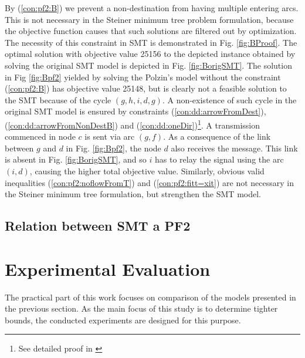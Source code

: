      By (\ref{con:pf2:B}) we prevent a non-destination from having multiple entering arcs. This is not necessary in the Steiner minimum tree problem formulation, because the objective function causes that such solutions are filtered out by optimization. The necessity of this constraint in SMT is demonstrated in Fig. \ref{fig:BProof}. The optimal solution with objective value 25156 to the depicted instance obtained by solving the original SMT model is depicted in Fig. \ref{fig:BorigSMT}. The solution in Fig \ref{fig:Bpf2} yielded by solving the Polzin's model without the constraint (\ref{con:pf2:B}) has objective value 25148, but is clearly not a feasible solution to the SMT because of the cycle $(g,h,i,d,g)$. A non-existence of such cycle in the original SMT model is ensured by constraints (\ref{con:dd:arrowFromDest}), (\ref{con:dd:arrowFromNonDestB}) and (\ref{con:dd:oneDir})\footnote{See detailed proof in \cite{ivanova16isco}}. A transmission commenced in node $c$ is sent via arc $(g,f)$. As a consequence of the link between $g$ and $d$ in Fig. \ref{fig:Bpf2}, the node $d$ also receives the message. This link is absent in Fig. \ref{fig:BorigSMT}, and so $i$ has to relay the signal using the arc $(i,d)$, causing the higher total objective value. Similarly, obvious valid inequalities (\ref{con:pf2:noflowFromT}) and (\ref{con:pf2:fitt=xit}) are not necessary in the Steiner minimum tree formulation, but strengthen the SMT model.
   
\subsection{Relation between SMT a PF2}
\section{Experimental Evaluation}
\label{sec:exp}
The practical part of this work focuses on comparison of the models presented in the previous section. As the main focus of this study is to determine tighter bounds, the conducted experiments are designed for this purpose. 

